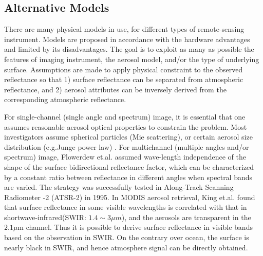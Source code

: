 \label{homogeneous}

\subsection{Alternative Models}
There are many physical models in use, for different types of remote-sensing instrument\cite{king1999}. Models are proposed in accordance with the hardware advantages and limited by its disadvantages. The goal is to exploit as many as possible the features of imaging instrument, the aerosol model, and/or the type of underlying surface. Assumptions are made to apply physical constraint to the observed reflectance so that 1) surface reflectance can be separated from atmospheric reflectance, and 2) aerosol attributes can be inversely derived from the corresponding atmospheric reflectance. 

For single-channel (single angle and spectrum) image, it is essential that one assumes reasonable aerosol optical properties to constrain the problem. Most investigators assume spherical particles (Mie scattering), or certain aerosol size distribution (e.g.Junge power law) \cite{rao}. For multichannel (multiple angles and/or spectrum) image, Flowerdew et.al. assumed wave-length independence of the shape of the surface bidirectional reflectance factor, which can be characterized by a constant ratio between reflectance in different angles when spectral bands are varied\cite{flowerdew}. The strategy was successfully tested in Along-Track Scanning Radiometer -2 (ATSR-2) in 1995. In MODIS aerosol retrieval, King et.al. found that surface reflectance in some visible wavelengths is correlated with that in shortwave-infrared(SWIR: $1.4\sim 3\mu m$), and the aerosols are transparent in the $2.1\mu$m channel. Thus it is possible to derive surface reflectance in visible bands based on the observation in SWIR. On the contrary over ocean, the surface is nearly black in SWIR, and hence atmosphere signal can be directly obtained.\cite{king1992} 

